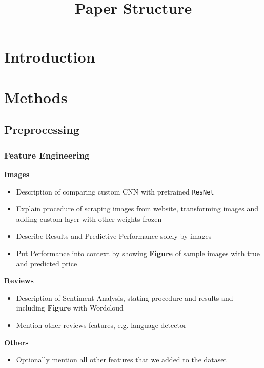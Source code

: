 \documentclass[12pt, letterpaper]{article}
\title{Paper Structure}
\author{}
\date{}
\begin{document}
\maketitle
\tableofcontents
\setcounter{tocdepth}{3}

\section{Introduction}

\section{Methods}

\subsection{Preprocessing}

\subsubsection{Feature Engineering}

\textbf{Images}
\begin{itemize}
    \item Description of comparing custom CNN with pretrained \texttt{ResNet}
    \item Explain procedure of scraping images from website, transforming images and adding custom layer with other weights frozen
    \item Describe Results and Predictive Performance solely by images
    \item Put Performance into context by showing \textbf{Figure} of sample images with true and predicted price
\end{itemize}

\textbf{Reviews}
\begin{itemize}
    \item Description of Sentiment Analysis, stating procedure and results and including \textbf{Figure} with Wordcloud
    \item Mention other reviews features, e.g. language detector
\end{itemize}

\textbf{Others}
\begin{itemize}
    \item Optionally mention all other features that we added to the dataset
\end{itemize}
\end{document}
